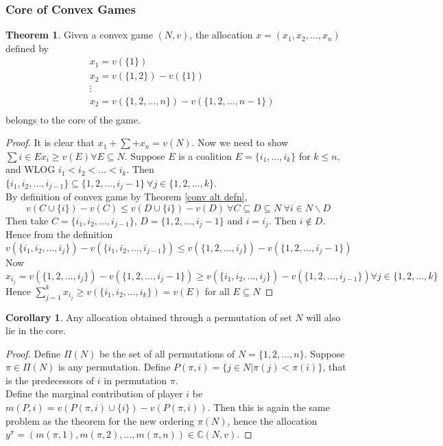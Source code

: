\documentclass{article}
\theoremstyle{definition}
\newtheorem{theorem}{Theorem}[section]
\newtheorem{cor}{Corollary}[theorem]
\begin{document}
\subsubsection{Core of Convex Games}
\begin{theorem}
Given a convex game $(N,v)$, the allocation $x=(x_1,x_2,\dots,x_n)$ defined by 
\begin{align*}
&x_1 = v(\{1\})\\
&x_2 = v(\{1,2\}) - v(\{1\})\\
&\vdots\\
&x_2 = v(\{1,2,\dots,n\}) - v(\{1,2,\dots,n-1\})\\
\end{align*} belongs to the core of the game.
\end{theorem}
\begin{proof}
It is clear that $x_1 + \sum + x_n = v(N)$. Now we need to show $\sum{i \in E} x_i \geq v(E)\forall E\subseteq N$. Suppose $E$ is a coalition $E = \{i_1,\dots,i_k\}$ for $k\leq n$, and WLOG $i_1<i_2<\dots<i_k$. Then $\{i_1,i_2,\dots,i_{j-1}\} \subseteq \{1,2,\dots,i_j-1\}~\forall j \in \{1,2,\dots,k\}$.\\
By definition of convex game by Theorem \ref{conv alt defn}, $$v(C\cup \{i\}) - v(C) \leq v(D\cup \{i\}) - v(D) ~\forall C\subseteq D\subseteq N ~\forall i \in N\backslash D$$ Then take $C = \{i_1,i_2,\dots,i_{j-1}\}$, $D = \{1,2,\dots,i_j-1\}$ and $i = i_j$. Then $i \notin D$. Hence from the definition $$v(\{i_1,i_2,\dots,i_j\}) - v(\{i_1,i_2,\dots,i_{j-1}\}) \leq v(\{1,2,\dots,i_j\}) - v(\{1,2,\dots,i_j-1\})$$
Now $$x_{i_j} = v(\{1,2,\dots,i_j\}) - v(\{1,2,\dots,i_j-1\}) \geq v(\{i_1,i_2,\dots,i_j\}) - v(\{1,2,\dots,i_{j-1}\})	\forall j \in \{1,2,\dots,k\}$$ Hence $\sum_{j=1}^k x_{i_j} \geq v(\{i_1,i_2,\dots,i_k\}) = v(E)$ for all $ E\subseteq N$
\end{proof}
\begin{cor}
\label{convex game core}
Any allocation obtained through a permutation of set $N$ will also lie in the core.
\end{cor}
\begin{proof}
Define $\Pi(N)$ be the set of all permutations of $N=\{1,2,\dots,n\}$. Suppose $ \pi \in \Pi(N)$ is any permutation. Define $P(\pi,i) = \{j \in N| \pi(j)<\pi(i)\}$, that is the predecessors of $i$ in permutation $\pi$.\\
Define the marginal contribution of player $i$ be $m(P,i) = v(P(\pi,i) \cup \{i\}) - v(P(\pi,i))$. Then this is again the same problem as the theorem for the new ordering $\pi(N)$, hence the allocation $y^{\pi} = (m(\pi,1),m(\pi,2),\dots,m(\pi,n)) \in \mathbb{C}(N,v)$. 
\end{proof}
\end{document}
